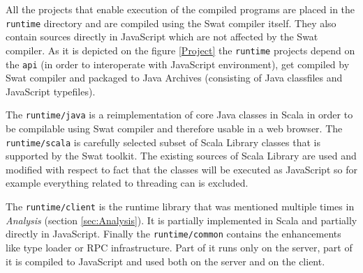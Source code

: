 \documentclass[12pt,a4paper]{report}
\begin{document}
All the projects that enable execution of the compiled programs are placed in the \texttt{runtime} directory and are compiled using the Swat compiler itself. They also contain sources directly in JavaScript which are not affected by the Swat compiler. As it is depicted on the figure \ref{Project} the \texttt{runtime} projects depend on the \texttt{api} (in order to interoperate with JavaScript environment), get compiled by Swat compiler and packaged to Java Archives (consisting of Java classfiles and JavaScript typefiles).

The \texttt{runtime/java} is a reimplementation of core Java classes in Scala in order to be compilable using Swat compiler and therefore usable in a web browser. The \texttt{runtime/scala} is carefully selected subset of Scala Library classes that is supported by the Swat toolkit. The existing sources of Scala Library are used and modified with respect to fact that the classes will be executed as JavaScript so for example everything related to threading can is excluded. 

The \texttt{runtime/client} is the runtime library that was mentioned multiple times in {\it Analysis} (section \ref{sec:Analysis}). It is partially implemented in Scala and partially directly in JavaScript. Finally the \texttt{runtime/common} contains the enhancements like type loader or RPC infrastructure. Part of it runs only on the server, part of it is compiled to JavaScript and used both on the server and on the client.
\end{document}
